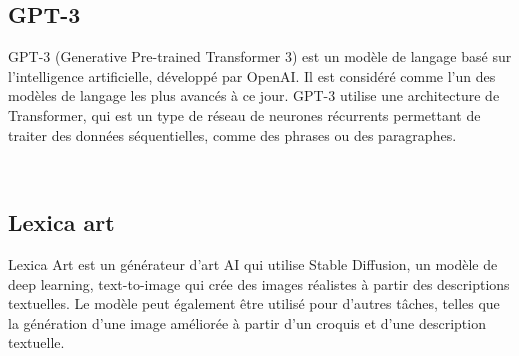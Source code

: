 \documentclass[11,5pt]{report}
\begin{document}
\begin{spacing}{2}
\subsection{GPT-3}\label{sec:GP}
GPT-3 (Generative Pre-trained Transformer 3) est un modèle de langage basé sur l'intelligence artificielle, développé par OpenAI. Il est considéré comme l'un des modèles de langage les plus avancés à ce jour. GPT-3 utilise une architecture de Transformer, qui est un type de réseau de neurones récurrents permettant de traiter des données séquentielles, comme des phrases ou des paragraphes.\newline

\begin{minipage}{\linewidth}
	\label{f3}%
\end{minipage}\\

\subsection{Lexica art}\label{sec:Lex}
Lexica Art\cite{Lexica} est un générateur d'art AI qui utilise Stable Diffusion, un modèle de deep learning, text-to-image qui crée des images réalistes à partir des descriptions textuelles. Le modèle peut également être utilisé pour d'autres tâches, telles que la génération d'une image améliorée à partir d'un croquis et d'une description textuelle. \newline



\end{spacing}
\end{document}
